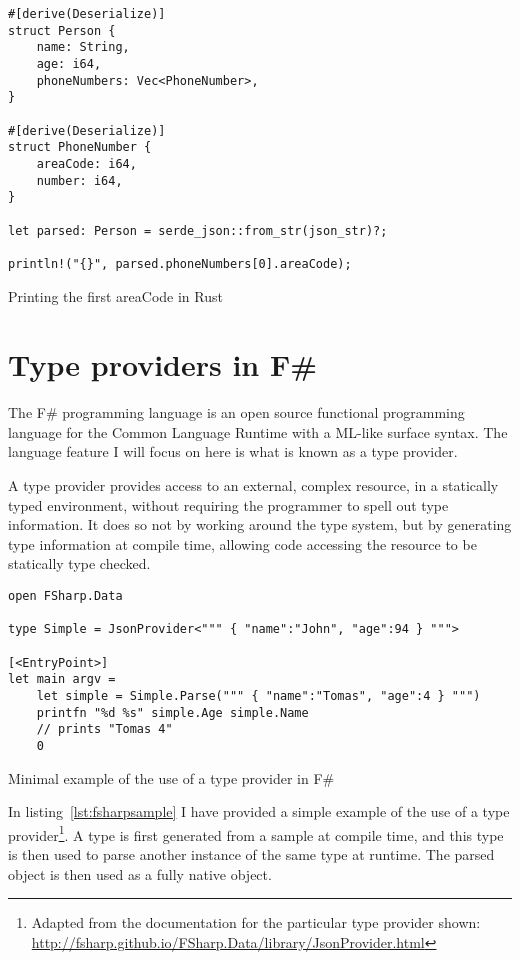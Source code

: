\begin{listing}[ht!]
\begin{verbatim}
#[derive(Deserialize)]
struct Person {
    name: String,
    age: i64,
    phoneNumbers: Vec<PhoneNumber>,
}

#[derive(Deserialize)]
struct PhoneNumber {
    areaCode: i64,
    number: i64,
}

let parsed: Person = serde_json::from_str(json_str)?;

println!("{}", parsed.phoneNumbers[0].areaCode);
\end{verbatim}
\caption{Printing the first areaCode in Rust}
\label{lst:readjsonrs3}
\end{listing}

\section{Type providers in F\#}

The F\# programming language is an open source functional programming language for the Common Language Runtime with a ML-like surface syntax. The language feature I will focus on here is what is known as a type provider.

A type provider provides access to an external, complex resource, in a statically typed environment, without requiring the programmer to spell out type information. It does so not by working around the type system, but by generating type information at compile time, allowing code accessing the resource to be statically type checked.

\begin{listing}[ht!]
\begin{verbatim}
open FSharp.Data

type Simple = JsonProvider<""" { "name":"John", "age":94 } """>

[<EntryPoint>]
let main argv =
    let simple = Simple.Parse(""" { "name":"Tomas", "age":4 } """)
    printfn "%d %s" simple.Age simple.Name
    // prints "Tomas 4"
    0
\end{verbatim}
\caption{Minimal example of the use of a type provider in F\#}
\label{lst:fsharpsample}
\end{listing}

In listing~\ref{lst:fsharpsample} I have provided a simple example of the use of a type provider\footnote{Adapted from the documentation for the particular type provider shown: \url{http://fsharp.github.io/FSharp.Data/library/JsonProvider.html}}. A type is first generated from a sample at compile time, and this type is then used to parse another instance of the same type at runtime. The parsed object is then used as a fully native object.

